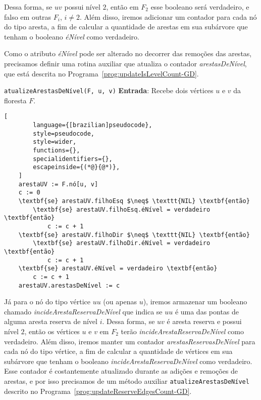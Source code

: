 Dessa forma, se $uv$ possui nível $2$, então em $F_2$ esse booleano será verdadeiro, e falso em outras $F_i$, $i \neq 2$. Além disso, iremos adicionar um contador  para cada nó do tipo aresta, a fim de calcular a quantidade de arestas em sua subárvore que tenham o booleano \textit{éNível} como verdadeiro. 

Como o atributo \textit{éNível} pode ser alterado no decorrer das remoções das arestas, precisamos definir uma rotina auxiliar que atualiza o contador \textit{arestasDeNível}, que está descrita no Programa~\ref{prog:updateIsLevelCount-GD}.

\begin{programruledcaption}{\texttt{atualizeArestasDeNível(F, u, v)} \label{prog:updateIsLevelCount-GD}}
    \noindent\textbf{Entrada}: Recebe dois vértices $u$ e $v$ da floresta $F$.
    \vspace{-0.5\baselineskip}
    \begin{lstlisting}[
        language={[brazilian]pseudocode},
        style=pseudocode,
        style=wider,
        functions={},
        specialidentifiers={},
        escapeinside={(*@}{@*)},
    ]
    arestaUV := F.nó[u, v]
    c := 0
    \textbf{se} arestaUV.filhoEsq $\neq$ \texttt{NIL} \textbf{então}
        \textbf{se} arestaUV.filhoEsq.éNível = verdadeiro \textbf{então}
            c := c + 1
    \textbf{se} arestaUV.filhoDir $\neq$ \texttt{NIL} \textbf{então}
        \textbf{se} arestaUV.filhoDir.éNível = verdadeiro \textbf{então}
            c := c + 1
    \textbf{se} arestaUV.éNível = verdadeiro \textbf{então}
        c := c + 1
    arestaUV.arestasDeNível := c
\end{lstlisting}
\vspace{-0.5\baselineskip}
\end{programruledcaption}

Já para o nó do tipo vértice $uu$ (ou apenas $u$), iremos armazenar um booleano chamado \textit{incideArestaReservaDeNível} que indica se $uu$ é uma das pontas de alguma aresta reserva de nível $i$. Dessa forma, se $uv$ é aresta reserva e possui nível $2$, então os vértices $u$ e $v$ em $F_2$ terão \textit{incideArestaReservaDeNível} como verdadeiro. Além disso, iremos manter um contador \textit{arestasReservasDeNível} para cada nó do tipo vértice, a fim de calcular a quantidade de vértices em sua subárvore que tenham o booleano \textit{incideArestaReservaDeNível} como verdadeiro. Esse contador é costantemente atualizado durante as adições e remoções de arestas, e por isso precisamos de um método auxiliar \texttt{atualizeArestasDeNível} descrito no Programa~\ref{prog:updateReserveEdgesCount-GD}.

